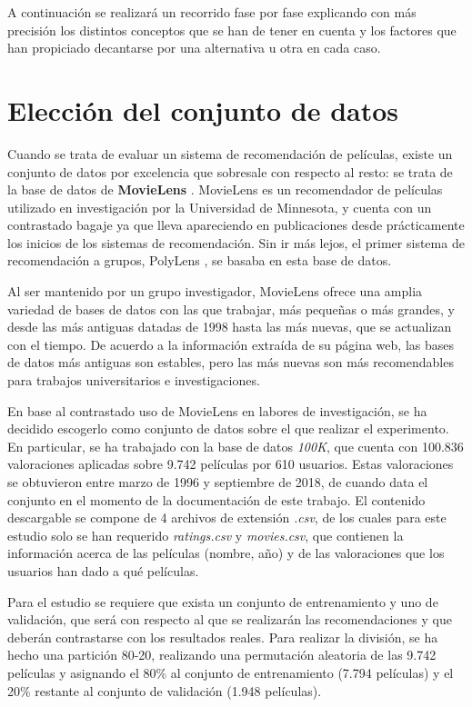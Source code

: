 A continuación se realizará un recorrido fase por fase explicando con más precisión los distintos conceptos que se han de tener en cuenta y los factores que han propiciado decantarse por una alternativa u otra en cada caso.

\section{Elección del conjunto de datos}

Cuando se trata de evaluar un sistema de recomendación de películas, existe un conjunto de datos por excelencia que sobresale con respecto al resto: se trata de la base de datos de \textbf{MovieLens} \cite{movielens} \cite{movielens-paper}. MovieLens es un recomendador de películas utilizado en investigación por la Universidad de Minnesota, y cuenta con un contrastado bagaje ya que lleva apareciendo en publicaciones desde prácticamente los inicios de los sistemas de recomendación. Sin ir más lejos, el primer sistema de recomendación a grupos, PolyLens \cite{polylens}, se basaba en esta base de datos.

Al ser mantenido por un grupo investigador, MovieLens ofrece una amplia variedad de bases de datos con las que trabajar, más pequeñas o más grandes, y desde las más antiguas datadas de 1998 hasta las más nuevas, que se actualizan con el tiempo. De acuerdo a la información extraída de su página web, las bases de datos más antiguas son estables, pero las más nuevas son más recomendables para trabajos universitarios e investigaciones.

En base al contrastado uso de MovieLens en labores de investigación, se ha decidido escogerlo como conjunto de datos sobre el que realizar el experimento. En particular, se ha trabajado con la base de datos \textit{100K}, que cuenta con 100.836 valoraciones aplicadas sobre 9.742 películas por 610 usuarios. Estas valoraciones se obtuvieron entre marzo de 1996 y septiembre de 2018, de cuando data el conjunto en el momento de la documentación de este trabajo. El contenido descargable se compone de 4 archivos de extensión \textit{.csv}, de los cuales para este estudio solo se han requerido \textit{ratings.csv} y \textit{movies.csv}, que contienen la información acerca de las películas (nombre, año) y de las valoraciones que los usuarios han dado a qué películas.

Para el estudio se requiere que exista un conjunto de entrenamiento y uno de validación, que será con respecto al que se realizarán las recomendaciones y que deberán contrastarse con los resultados reales. Para realizar la división, se ha hecho una partición 80-20, realizando una permutación aleatoria de las 9.742 películas y asignando el 80\% al conjunto de entrenamiento (7.794 películas) y el 20\% restante al conjunto de validación (1.948 películas).

